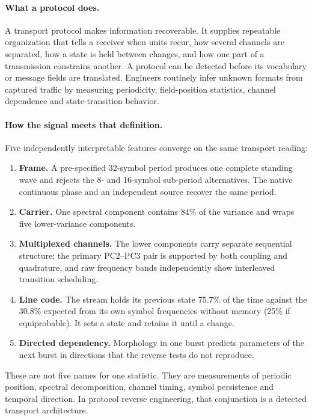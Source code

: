 \documentclass[11pt,a4paper]{article}
\begin{document}
\paragraph{What a protocol does.} A transport protocol makes information recoverable.
It supplies repeatable organization that tells a receiver when units recur, how several
channels are separated, how a state is held between changes, and how one part of a
transmission constrains another. A protocol can be detected before its vocabulary or
message fields are translated. Engineers routinely infer unknown formats from captured
traffic by measuring periodicity, field-position statistics, channel dependence and
state-transition behavior.

\paragraph{How the signal meets that definition.} Five independently interpretable
features converge on the same transport reading:

\begin{enumerate}[leftmargin=1.6em,itemsep=3pt]
\item \textbf{Frame.} A pre-specified 32-symbol period produces one complete standing
wave and rejects the 8- and 16-symbol sub-period alternatives. The native continuous
phase and an independent source recover the same period.
\item \textbf{Carrier.} One spectral component contains 84\% of the variance and wraps
five lower-variance components.
\item \textbf{Multiplexed channels.} The lower components carry separate sequential
structure; the primary PC2--PC3 pair is supported by both coupling and quadrature, and
raw frequency bands independently show interleaved transition scheduling.
\item \textbf{Line code.} The stream holds its previous state 75.7\% of the time
against the 30.8\% expected from its own symbol frequencies without memory (25\% if
equiprobable). It sets a state and retains it until a change.
\item \textbf{Directed dependency.} Morphology in one burst predicts parameters of the
next burst in directions that the reverse tests do not reproduce.
\end{enumerate}

These are not five names for one statistic. They are measurements of periodic position,
spectral decomposition, channel timing, symbol persistence and temporal direction. In
protocol reverse engineering, that conjunction is a detected transport architecture.
\end{document}
